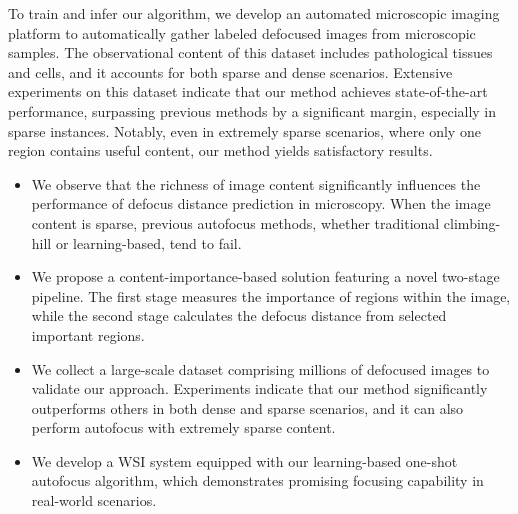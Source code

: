 To train and infer our algorithm, we develop an automated microscopic imaging platform to automatically gather labeled defocused images from microscopic samples. The observational content of this dataset includes pathological tissues and cells, and it accounts for both sparse and dense scenarios. Extensive experiments on this dataset indicate that our method achieves state-of-the-art performance, surpassing previous methods by a significant margin, especially in sparse instances. Notably, even in extremely sparse scenarios, where only one region contains useful content, our method yields satisfactory results. 



\begin{itemize}
\item We observe that the richness of image content significantly influences the performance of defocus distance prediction in microscopy. When the image content is sparse, previous autofocus methods, whether traditional climbing-hill or learning-based, tend to fail.
\item We propose a content-importance-based solution featuring a novel two-stage pipeline. The first stage measures the importance of regions within the image, while the second stage calculates the defocus distance from selected important regions.
\item We collect a large-scale dataset comprising millions of defocused images to validate our approach. Experiments indicate that our method significantly outperforms others in both dense and sparse scenarios, and it can also perform autofocus with extremely sparse content.
\item We develop a WSI system equipped with our learning-based one-shot autofocus algorithm, which demonstrates promising focusing capability in real-world scenarios.
\end{itemize}



